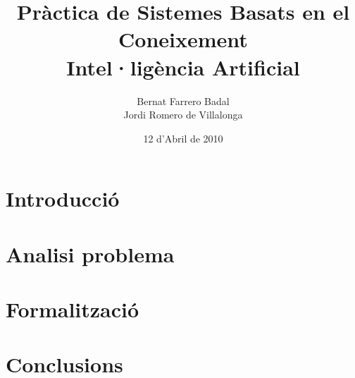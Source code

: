\documentclass[a4paper]{report}
\author{Bernat Farrero Badal \\Jordi Romero de Villalonga}
\title{Pràctica de Sistemes Basats en el Coneixement \\ Intel·ligència Artificial}
\date{12 d'Abril de 2010}
\begin{document}
\maketitle

\tableofcontents

\newpage

\chapter{Introducció}


\chapter{Analisi problema}


\chapter{Formalització}


\chapter{Conclusions}

\end{document}
